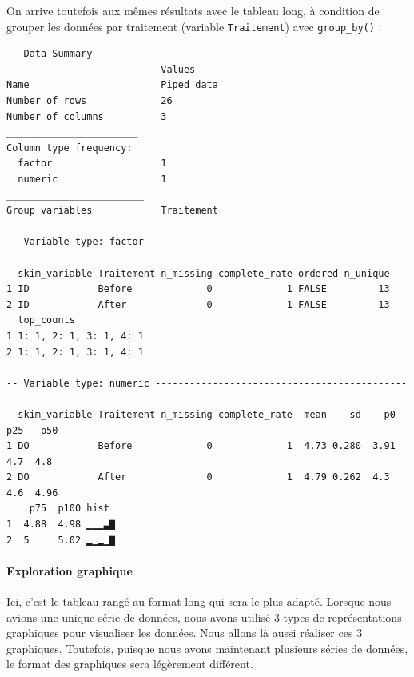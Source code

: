 \documentclass[a4paperpaper,]{article}
\newenvironment{Shaded}{\begin{snugshade}}{\end{snugshade}}
\newcommand{\KeywordTok}[1]{\textcolor[rgb]{0.12,0.11,0.11}{\textbf{#1}}}
\newcommand{\NormalTok}[1]{\textcolor[rgb]{0.12,0.11,0.11}{#1}}
\newcommand{\OperatorTok}[1]{\textcolor[rgb]{0.12,0.11,0.11}{#1}}
\newcommand{\StringTok}[1]{\textcolor[rgb]{0.75,0.01,0.01}{#1}}
\let\oldparagraph\paragraph
\renewcommand{\paragraph}[1]{\oldparagraph{#1}\mbox{}}
\begin{document}
On arrive toutefois aux mêmes résultats avec le tableau long, à condition de grouper les données par traitement (variable \texttt{Traitement}) avec \texttt{group\_by()} :

\begin{Shaded}
\end{Shaded}

\begin{verbatim}
-- Data Summary ------------------------
                           Values    
Name                       Piped data
Number of rows             26        
Number of columns          3         
_______________________              
Column type frequency:               
  factor                   1         
  numeric                  1         
________________________             
Group variables            Traitement

-- Variable type: factor ---------------------------------------------------------------------------
  skim_variable Traitement n_missing complete_rate ordered n_unique
1 ID            Before             0             1 FALSE         13
2 ID            After              0             1 FALSE         13
  top_counts            
1 1: 1, 2: 1, 3: 1, 4: 1
2 1: 1, 2: 1, 3: 1, 4: 1

-- Variable type: numeric --------------------------------------------------------------------------
  skim_variable Traitement n_missing complete_rate  mean    sd    p0   p25   p50
1 DO            Before             0             1  4.73 0.280  3.91   4.7  4.8 
2 DO            After              0             1  4.79 0.262  4.3    4.6  4.96
    p75  p100 hist 
1  4.88  4.98 ▁▁▁▃▇
2  5     5.02 ▂▁▂▁▇
\end{verbatim}

\hypertarget{exploration-graphique-1}{%
\paragraph{Exploration graphique}\label{exploration-graphique-1}}

Ici, c'est le tableau rangé au format long qui sera le plus adapté. Lorsque nous avions une unique série de données, nous avons utilisé 3 types de représentations graphiques pour visualiser les données. Nous allons là aussi réaliser ces 3 graphiques. Toutefois, puisque nous avons maintenant plusieurs séries de données, le format des graphiques sera légèrement différent.
\end{document}
